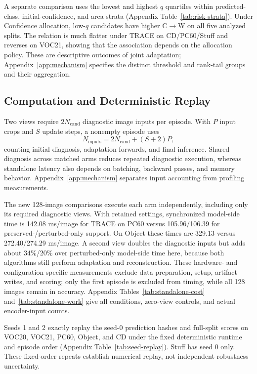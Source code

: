 \documentclass[letterpaper]{article}
\begin{document}


A separate comparison uses the lowest and highest $q$ quartiles within predicted-class, initial-confidence, and area strata (Appendix Table~\ref{tab:risk-strata}). Under Confidence allocation, low-$q$ candidates have higher C$\to$W on all five analyzed splits. The relation is much flatter under TRACE on CD/PC60/Stuff and reverses on VOC21, showing that the association depends on the allocation policy. These are descriptive outcomes of joint adaptation; Appendix~\ref{app:mechanism} specifies the distinct threshold and rank-tail groups and their aggregation.

\subsection{Computation and Deterministic Replay}
Two views require $2N_{\mathrm{cand}}$ diagnostic image inputs per episode. With $P$ input crops and $S$ update steps, a nonempty episode uses
\begin{equation}
N_{\mathrm{inputs}}=2N_{\mathrm{cand}}+(S+2)P,
\end{equation}
counting initial diagnosis, adaptation forwards, and final inference. Shared diagnosis across matched arms reduces repeated diagnostic execution, whereas standalone latency also depends on batching, backward passes, and memory behavior. Appendix~\ref{app:mechanism} separates input accounting from profiling measurements.

The new 128-image comparisons execute each arm independently, including only its required diagnostic views. With retained settings, synchronized model-side time is 142.08 ms/image for TRACE on PC60 versus 105.96/106.39 for preserved-/perturbed-only support. On Object these times are 329.13 versus 272.40/274.29 ms/image. A second view doubles the diagnostic inputs but adds about 34\%/20\% over perturbed-only model-side time here, because both algorithms still perform adaptation and reconstruction. These hardware- and configuration-specific measurements exclude data preparation, setup, artifact writes, and scoring; only the first episode is excluded from timing, while all 128 images remain in accuracy. Appendix Tables~\ref{tab:standalone-cost} and~\ref{tab:standalone-work} give all conditions, zero-view controls, and actual encoder-input counts.

Seeds 1 and 2 exactly replay the seed-0 prediction hashes and full-split scores on VOC20, VOC21, PC60, Object, and CD under the fixed deterministic runtime and episode order (Appendix Table~\ref{tab:seed-replay}). Stuff has seed 0 only. These fixed-order repeats establish numerical replay, not independent robustness uncertainty.
\end{document}
